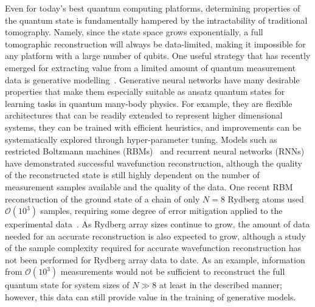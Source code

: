 \documentclass[twocolumn,
                showpacs,
                nofootinbib,
                nobibnotes,
                aps,
                superscriptaddress,
                amssymb,
                amsmath,
                floatfix,
                reprint,
                prx, 
                notitlepage,
                showkeys,
                10pt,
		]{revtex4-2}
\begin{document}
Even for today's best quantum computing platforms, determining properties of the quantum state is fundamentally hampered by the intractability of traditional tomography.  Namely, since the state space grows exponentially, a full tomographic reconstruction will always be data-limited, making it impossible for any platform with a large number of qubits.
One useful strategy that has recently emerged for extracting value from a limited amount of quantum measurement data is generative modelling~\cite{torlai2018neural}.
Generative neural networks have many desirable properties that make them especially suitable as ansatz quantum states for learning tasks in quantum many-body physics. 
For example, they are flexible architectures that can be readily extended to represent higher dimensional systems, they can be trained with efficient heuristics, and improvements can be systematically explored through hyper-parameter tuning.
Models such as restricted Boltzmann machines (RBMs)~\cite{RBM_review,lange2022adaptive} and recurrent neural networks (RNNs)~\cite{Juan19generative,czischek2022data,iouchtchenko2023neural} have demonstrated successful wavefunction reconstruction, although the quality of the reconstructed state is still highly dependent on the number of measurement samples available and the quality of the data.
One recent RBM reconstruction of the ground state of a chain of only $N = 8$ Rydberg atoms used $\mathcal{O}(10^3)$ samples, requiring some degree of error mitigation applied to the experimental data~\cite{torlai2019integrating}.
As Rydberg array sizes continue to grow, the amount of data needed for an accurate reconstruction is also expected to grow, although a study of the sample complexity required for accurate wavefunction reconstruction has not been performed for Rydberg array data to date.  
As an example, information from $\mathcal{O}(10^3)$ measurements would not be sufficient to reconstruct the full quantum state for system sizes of $N \gg 8$ at least in the described manner; however, this data can still provide value in the training of generative models.
\end{document}
